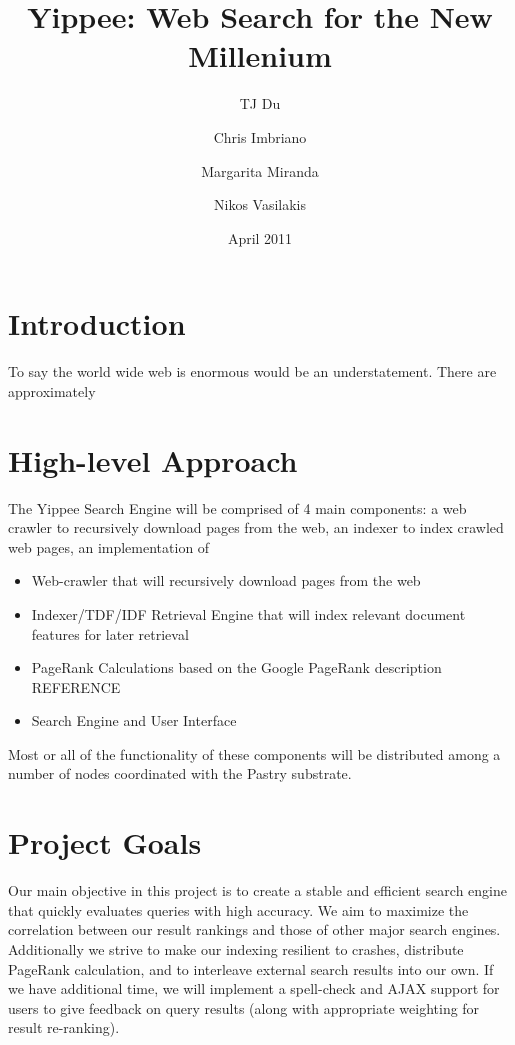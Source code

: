 \documentclass[11pt, letterpaper, oneside, twocolumn]{article}
\begin{document}
\title{Yippee: Web Search for the New Millenium}
\author{	TJ Du
	\and Chris Imbriano
	\and Margarita Miranda
	\and Nikos Vasilakis}
\date{April 2011}

\maketitle

\section{ Introduction }

To say the world wide web is enormous would be an understatement.  There are approximately 

\section{ High-level Approach }

The Yippee Search Engine will be comprised of 4 main components: a web crawler to recursively download pages from the web, an indexer to index crawled web pages, an implementation of 
\begin{itemize}
\item Web-crawler that will recursively download pages from the web
\item Indexer/TDF/IDF Retrieval Engine that will index relevant document features for later retrieval 
\item PageRank Calculations based on the Google PageRank description REFERENCE
\item Search Engine and User Interface
\end{itemize}

Most or all of the functionality of these components will be distributed among a number of nodes coordinated with the Pastry substrate.

\section{ Project Goals }

Our main objective in this project is to create a stable and efficient search engine that quickly evaluates queries with high accuracy. We aim to maximize the correlation between our result rankings and those of other major search engines. Additionally we strive to make our indexing resilient to crashes, distribute PageRank calculation, and to interleave external search results into our own. If we have additional time, we will implement a spell-check and AJAX support for users to give feedback on query results (along with appropriate weighting for result re-ranking).
\end{document}
